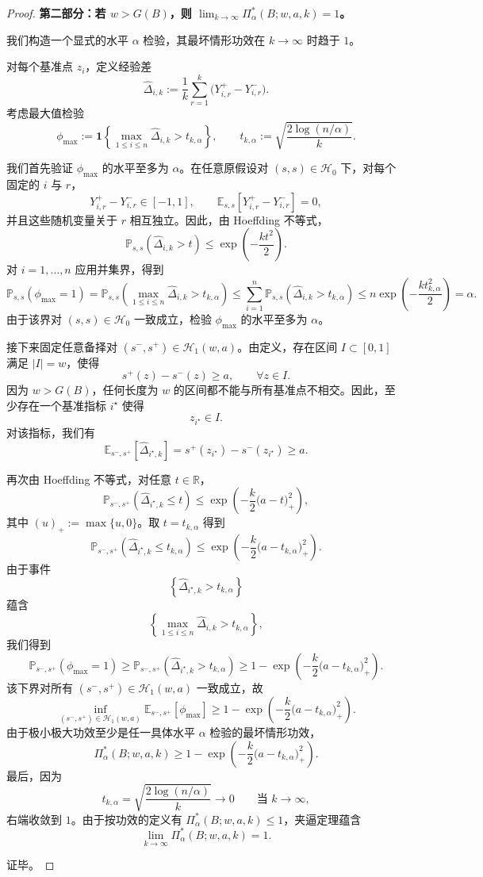 \begin{proof}
\smallskip
\noindent\textbf{第二部分：若 $w>G(B)$，则 $\lim_{k\to\infty}\Pi_\alpha^*(B;w,a,k)=1$。}

我们构造一个显式的水平 $\alpha$ 检验，其最坏情形功效在 $k\to\infty$ 时趋于 $1$。

对每个基准点 $z_i$，定义经验差
\[
\widehat{\Delta}_{i,k}
:=
\frac{1}{k}\sum_{r=1}^k\bigl(Y_{i,r}^{+}-Y_{i,r}^{-}\bigr).
\]
考虑最大值检验
\[
\phi_{\max}
:=
\mathbf 1\left\{
\max_{1\le i\le n}\widehat{\Delta}_{i,k}
>
t_{k,\alpha}
\right\},
\qquad
t_{k,\alpha}
:=
\sqrt{\frac{2\log(n/\alpha)}{k}}.
\]

我们首先验证 $\phi_{\max}$ 的水平至多为 $\alpha$。在任意原假设对 $(s,s)\in\mathcal H_0$ 下，对每个固定的 $i$ 与 $r$，
\[
Y_{i,r}^{+}-Y_{i,r}^{-}\in[-1,1],
\qquad
\mathbb E_{s,s}[Y_{i,r}^{+}-Y_{i,r}^{-}]=0,
\]
并且这些随机变量关于 $r$ 相互独立。因此，由 Hoeffding 不等式，
\[
\mathbb P_{s,s}\!\left(\widehat{\Delta}_{i,k}>t\right)
\le
\exp\!\left(-\frac{k t^2}{2}\right).
\]
对 $i=1,\dots,n$ 应用并集界，得到
\[
\mathbb P_{s,s}(\phi_{\max}=1)
=
\mathbb P_{s,s}\!\left(\max_{1\le i\le n}\widehat{\Delta}_{i,k}>t_{k,\alpha}\right)
\le
\sum_{i=1}^n
\mathbb P_{s,s}\!\left(\widehat{\Delta}_{i,k}>t_{k,\alpha}\right)
\le
n\exp\!\left(-\frac{k t_{k,\alpha}^2}{2}\right)
=
\alpha.
\]
由于该界对 $(s,s)\in\mathcal H_0$ 一致成立，检验 $\phi_{\max}$ 的水平至多为 $\alpha$。

接下来固定任意备择对 $(s^-,s^+)\in\mathcal H_1(w,a)$。由定义，存在区间 $I\subset[0,1]$ 满足 $|I|=w$，使得
\[
s^+(z)-s^-(z)\ge a,
\qquad \forall z\in I.
\]
因为 $w>G(B)$，任何长度为 $w$ 的区间都不能与所有基准点不相交。因此，至少存在一个基准指标 $i^\star$ 使得
\[
z_{i^\star}\in I.
\]
对该指标，我们有
\[
\mathbb E_{s^-,s^+}[\widehat{\Delta}_{i^\star,k}]
=
s^+(z_{i^\star})-s^-(z_{i^\star})
\ge a.
\]

再次由 Hoeffding 不等式，对任意 $t\in\mathbb R$，
\[
\mathbb P_{s^-,s^+}\!\left(
\widehat{\Delta}_{i^\star,k}\le t
\right)
\le
\exp\!\left(
-\frac{k}{2}\bigl(a-t\bigr)_+^2
\right),
\]
其中 $(u)_+:=\max\{u,0\}$。取 $t=t_{k,\alpha}$ 得到
\[
\mathbb P_{s^-,s^+}\!\left(
\widehat{\Delta}_{i^\star,k}\le t_{k,\alpha}
\right)
\le
\exp\!\left(
-\frac{k}{2}\bigl(a-t_{k,\alpha}\bigr)_+^2
\right).
\]
由于事件
\[
\left\{\widehat{\Delta}_{i^\star,k}>t_{k,\alpha}\right\}
\]
蕴含
\[
\left\{\max_{1\le i\le n}\widehat{\Delta}_{i,k}>t_{k,\alpha}\right\},
\]
我们得到
\[
\mathbb P_{s^-,s^+}(\phi_{\max}=1)
\ge
\mathbb P_{s^-,s^+}\!\left(
\widehat{\Delta}_{i^\star,k}>t_{k,\alpha}
\right)
\ge
1-
\exp\!\left(
-\frac{k}{2}\bigl(a-t_{k,\alpha}\bigr)_+^2
\right).
\]
该下界对所有 $(s^-,s^+)\in\mathcal H_1(w,a)$ 一致成立，故
\[
\inf_{(s^-,s^+)\in\mathcal H_1(w,a)}
\mathbb E_{s^-,s^+}[\phi_{\max}]
\ge
1-
\exp\!\left(
-\frac{k}{2}\bigl(a-t_{k,\alpha}\bigr)_+^2
\right).
\]
由于极小极大功效至少是任一具体水平 $\alpha$ 检验的最坏情形功效，
\[
\Pi_\alpha^*(B;w,a,k)
\ge
1-
\exp\!\left(
-\frac{k}{2}\bigl(a-t_{k,\alpha}\bigr)_+^2
\right).
\]
最后，因为
\[
t_{k,\alpha}
=
\sqrt{\frac{2\log(n/\alpha)}{k}}
\longrightarrow 0
\qquad\text{当 }k\to\infty,
\]
右端收敛到 $1$。由于按功效的定义有 $\Pi_\alpha^*(B;w,a,k)\le 1$，夹逼定理蕴含
\[
\lim_{k\to\infty}\Pi_\alpha^*(B;w,a,k)=1.
\]

证毕。
\end{proof}



